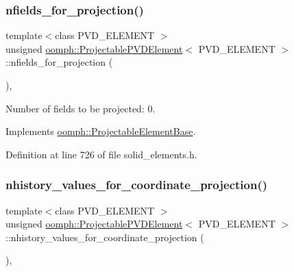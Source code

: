 \subsubsection{\texorpdfstring{nfields\+\_\+for\+\_\+projection()}{nfields\_for\_projection()}}
{\footnotesize\ttfamily template$<$class P\+V\+D\+\_\+\+E\+L\+E\+M\+E\+NT $>$ \\
unsigned \hyperlink{classoomph_1_1ProjectablePVDElement}{oomph\+::\+Projectable\+P\+V\+D\+Element}$<$ P\+V\+D\+\_\+\+E\+L\+E\+M\+E\+NT $>$\+::nfields\+\_\+for\+\_\+projection (\begin{DoxyParamCaption}{ }\end{DoxyParamCaption})\hspace{0.3cm}{\ttfamily [inline]}, {\ttfamily [virtual]}}



Number of fields to be projected\+: 0. 



Implements \hyperlink{classoomph_1_1ProjectableElementBase_a44634aa4049332a580d249c25564638c}{oomph\+::\+Projectable\+Element\+Base}.



Definition at line 726 of file solid\+\_\+elements.\+h.

\mbox{\label{classoomph_1_1ProjectablePVDElement_a82923f600601aa9f0c9e1b168f0d8fa5}} 
\subsubsection{\texorpdfstring{nhistory\+\_\+values\+\_\+for\+\_\+coordinate\+\_\+projection()}{nhistory\_values\_for\_coordinate\_projection()}}
{\footnotesize\ttfamily template$<$class P\+V\+D\+\_\+\+E\+L\+E\+M\+E\+NT $>$ \\
unsigned \hyperlink{classoomph_1_1ProjectablePVDElement}{oomph\+::\+Projectable\+P\+V\+D\+Element}$<$ P\+V\+D\+\_\+\+E\+L\+E\+M\+E\+NT $>$\+::nhistory\+\_\+values\+\_\+for\+\_\+coordinate\+\_\+projection (\begin{DoxyParamCaption}{ }\end{DoxyParamCaption})\hspace{0.3cm}{\ttfamily [inline]}, {\ttfamily [virtual]}}



